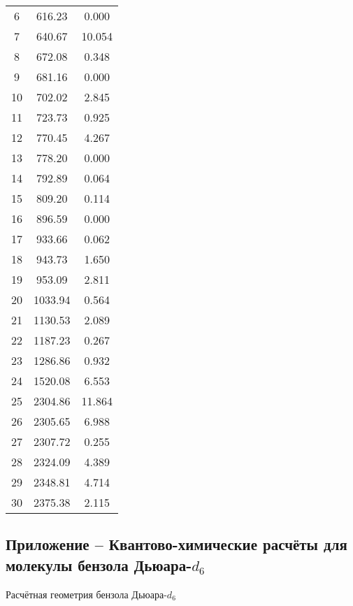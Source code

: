 {\begin{center}
\begin{tabular}{ccc}
     6 &  616.23 &     0.000 \\
     7 &  640.67 &    10.054 \\
     8 &  672.08 &     0.348 \\
     9 &  681.16 &     0.000 \\
   10 &  702.02 &     2.845 \\
    11 &  723.73 &    0.925 \\
    12 &  770.45 &    4.267 \\
    13 &  778.20 &    0.000 \\
    14 &  792.89 &    0.064 \\
    15 &  809.20 &   0.114 \\
    16 &  896.59 &   0.000 \\
    17 &  933.66 &   0.062 \\
    18 &  943.73 &   1.650 \\
    19 &  953.09 &    2.811 \\
    20 & 1033.94 &    0.564 \\
    21 & 1130.53 &   2.089 \\
    22 & 1187.23 &    0.267 \\
    23 & 1286.86 &   0.932 \\
    24 & 1520.08 &   6.553 \\
    25 & 2304.86 &  11.864 \\
    26 & 2305.65 &    6.988 \\
    27 & 2307.72 &    0.255 \\
    28 & 2324.09 &  4.389 \\
    29 & 2348.81 &    4.714 \\
    30 & 2375.38 &    2.115 \\
 \end{tabular}
\end{center}
\newpage
\subsection*{Приложение   -- Квантово-химические расчёты для молекулы бензола Дьюара-$d_6$}
Расчётная геометрия бензола Дьюара-$d_6$

}
